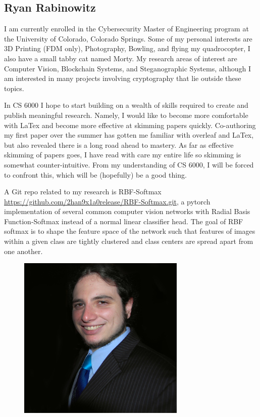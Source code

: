 \subsection{Ryan Rabinowitz}

I am currently enrolled in the Cybersecurity Master of Engineering program at the University of Colorado, Colorado Springs. Some of my personal interests are 3D Printing (FDM only), Photography, Bowling, and flying my quadrocopter, I also have a small tabby cat named Morty. 
My research areas of interest are Computer Vision, Blockchain Systems, and Steganographic Systems, although I am interested in many projects involving cryptography that lie outside these topics. 

In CS 6000 I hope to start building on a wealth of skills required to create and publish meaningful research. Namely, I would like to become more comfortable with LaTex and become more effective at skimming papers quickly. 
Co-authoring my first paper over the summer has gotten me familiar with overleaf and LaTex, but also revealed there is a long road ahead to mastery. As far as effective skimming of papers goes, I have read with care my entire life so skimming is somewhat counter-intuitive. 
From my understanding of CS 6000, I will be forced to confront this, which will be (hopefully) be a good thing.

A Git repo related to my research is RBF-Softmax \url{https://github.com/2han9x1a0release/RBF-Softmax.git}, a pytorch implementation of several common computer vision networks with Radial Basis Function-Softmax instead of a normal linear classifier head. The goal of RBF softmax is to shape the feature space of the network such that features of images within a given class are tightly clustered and class centers are spread apart from one another.
\begin{figure}[h]
\includegraphics[width=8cm]{Rabinowitz_Headshot.jpg}
\end{figure}
